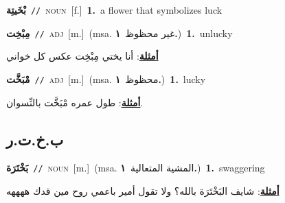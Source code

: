 \documentclass[10pt,a4paper,twoside]{article} %
\begin{document}
\begin{multicols}{2}
{\setlength\topsep{0pt}\textbf{\foreignlanguage{arabic}{بْخَيتِة}}\ {\color{gray}\texttt{//}\color{black}}\ \textsc{noun}\ [f.]\ \textbf{1.}~a flower that symbolizes luck\ } \vspace{2mm}

{\setlength\topsep{0pt}\textbf{\foreignlanguage{arabic}{مِبْخِت}}\ {\color{gray}\texttt{//}\color{black}}\ \textsc{adj}\ [m.]\ \color{gray}(msa. \foreignlanguage{arabic}{غير محظوظ}~\foreignlanguage{arabic}{\textbf{١.}})\color{black}\ \textbf{1.}~unlucky\  \begin{flushright}\color{gray}\foreignlanguage{arabic}{\textbf{\underline{\foreignlanguage{arabic}{أمثلة}}}: أنا يختي مِبْخِت عكس كل خواني}\end{flushright}\color{black}} \vspace{2mm}

{\setlength\topsep{0pt}\textbf{\foreignlanguage{arabic}{مْبَخَّت}}\ {\color{gray}\texttt{//}\color{black}}\ \textsc{adj}\ [m.]\ \color{gray}(msa. \foreignlanguage{arabic}{محظوظ}~\foreignlanguage{arabic}{\textbf{١.}})\color{black}\ \textbf{1.}~lucky\  \begin{flushright}\color{gray}\foreignlanguage{arabic}{\textbf{\underline{\foreignlanguage{arabic}{أمثلة}}}: طول عمره مْبَخَّت بالنِّسوان.}\end{flushright}\color{black}} \vspace{2mm}

\vspace{-3mm}
\subsection*{\color{blue}\foreignlanguage{arabic}{ب.خ.ت.ر}\color{blue}{}} 

{\setlength\topsep{0pt}\textbf{\foreignlanguage{arabic}{بَخْتَرَة}}\ {\color{gray}\texttt{//}\color{black}}\ \textsc{noun}\ [m.]\ \color{gray}(msa. \foreignlanguage{arabic}{المشية المتعالية}~\foreignlanguage{arabic}{\textbf{١.}})\color{black}\ \textbf{1.}~swaggering\  \begin{flushright}\color{gray}\foreignlanguage{arabic}{\textbf{\underline{\foreignlanguage{arabic}{أمثلة}}}: شايف البَخْتَرَة بالله؟ ولا تقول أمير باعمي روح مين قدك ههههه}\end{flushright}\color{black}} \vspace{2mm}


\end{multicols}
\end{document}
